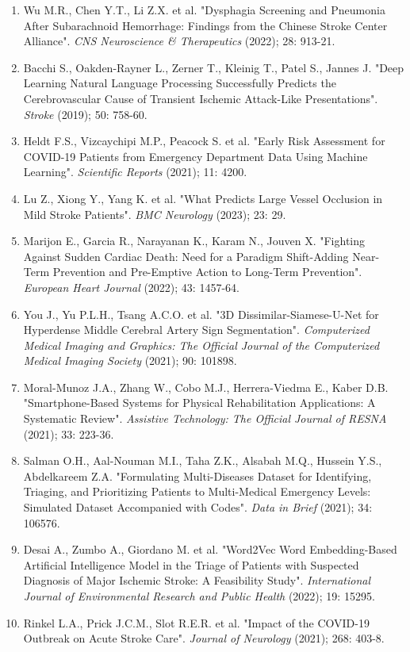 {{\begin{enumerate}
    \item Wu M.R., Chen Y.T., Li Z.X. et al. "Dysphagia Screening and Pneumonia After Subarachnoid Hemorrhage: Findings from the Chinese Stroke Center Alliance". \textit{CNS Neuroscience \& Therapeutics} (2022); 28: 913-21.
    \item Bacchi S., Oakden-Rayner L., Zerner T., Kleinig T., Patel S., Jannes J. "Deep Learning Natural Language Processing Successfully Predicts the Cerebrovascular Cause of Transient Ischemic Attack-Like Presentations". \textit{Stroke} (2019); 50: 758-60.
    \item Heldt F.S., Vizcaychipi M.P., Peacock S. et al. "Early Risk Assessment for COVID-19 Patients from Emergency Department Data Using Machine Learning". \textit{Scientific Reports} (2021); 11: 4200.
    \item Lu Z., Xiong Y., Yang K. et al. "What Predicts Large Vessel Occlusion in Mild Stroke Patients". \textit{BMC Neurology} (2023); 23: 29.
    \item Marijon E., Garcia R., Narayanan K., Karam N., Jouven X. "Fighting Against Sudden Cardiac Death: Need for a Paradigm Shift-Adding Near-Term Prevention and Pre-Emptive Action to Long-Term Prevention". \textit{European Heart Journal} (2022); 43: 1457-64.
    \item You J., Yu P.L.H., Tsang A.C.O. et al. "3D Dissimilar-Siamese-U-Net for Hyperdense Middle Cerebral Artery Sign Segmentation". \textit{Computerized Medical Imaging and Graphics: The Official Journal of the Computerized Medical Imaging Society} (2021); 90: 101898.
    \item Moral-Munoz J.A., Zhang W., Cobo M.J., Herrera-Viedma E., Kaber D.B. "Smartphone-Based Systems for Physical Rehabilitation Applications: A Systematic Review". \textit{Assistive Technology: The Official Journal of RESNA} (2021); 33: 223-36.
    \item Salman O.H., Aal-Nouman M.I., Taha Z.K., Alsabah M.Q., Hussein Y.S., Abdelkareem Z.A. "Formulating Multi-Diseases Dataset for Identifying, Triaging, and Prioritizing Patients to Multi-Medical Emergency Levels: Simulated Dataset Accompanied with Codes". \textit{Data in Brief} (2021); 34: 106576.
    \item Desai A., Zumbo A., Giordano M. et al. "Word2Vec Word Embedding-Based Artificial Intelligence Model in the Triage of Patients with Suspected Diagnosis of Major Ischemic Stroke: A Feasibility Study". \textit{International Journal of Environmental Research and Public Health} (2022); 19: 15295.
    \item Rinkel L.A., Prick J.C.M., Slot R.E.R. et al. "Impact of the COVID-19 Outbreak on Acute Stroke Care". \textit{Journal of Neurology} (2021); 268: 403-8.

\end{enumerate}}}
